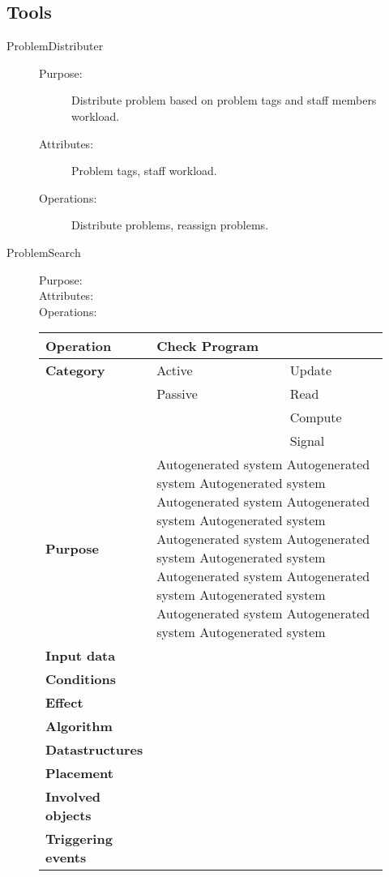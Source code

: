 \subsection{Tools}

\begin{description}
\item[ProblemDistributer]\hfill
\begin{description}
\item[Purpose:]Distribute problem based on problem tags and staff members workload.
\item[Attributes:]Problem tags, staff workload.
\item[Operations:]Distribute problems, reassign problems.
\end{description}
\end{description}

\begin{description}
\item[ProblemSearch]\hfill
\begin{description}
\item[Purpose:]
\item[Attributes:]
\item[Operations:]
\end{description}
\end{description}

\begin{figure}
\begin{tabular}{p{3cm} p{4.25cm} p{4.25cm}}
\hline
\textbf{Operation}&Check Program\\
\hline
\textbf{Category}&\underline{ }Active&\underline{ }Update\\
&\underline{ }Passive&\underline{ }Read\\
&&\underline{ }Compute\\
&&\underline{ }Signal\\
\textbf{Purpose}&\multicolumn{2}{p{8.5cm}}{Autogenerated system Autogenerated system Autogenerated system Autogenerated system Autogenerated system Autogenerated system
Autogenerated system Autogenerated system Autogenerated system Autogenerated system Autogenerated system Autogenerated system 
Autogenerated system Autogenerated system Autogenerated system}\\
\textbf{Input data}&\multicolumn{2}{p{8.5cm}}{}\\
\textbf{Conditions}&\multicolumn{2}{p{8.5cm}}{}\\
\textbf{Effect}&\multicolumn{2}{p{8.5cm}}{}\\
\textbf{Algorithm}&\multicolumn{2}{p{8.5cm}}{}\\
\textbf{Datastructures}&\multicolumn{2}{p{8.5cm}}{}\\
\textbf{Placement}&\multicolumn{2}{p{8.5cm}}{}\\
\textbf{Involved objects}&\multicolumn{2}{p{8.5cm}}{}\\
\textbf{Triggering events}&\multicolumn{2}{p{8.5cm}}{}\\
\hline
\end{tabular}
\end{figure}


